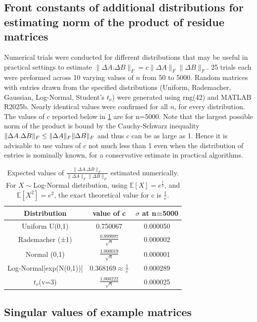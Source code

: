 \documentclass[onefignum,onetabnum]{siamart171218}
\DeclarePairedDelimiter\norm{\lVert}{\rVert}
\begin{document}
\subsection{Front constants of additional distributions for estimating norm of the product of residue matrices}
Numerical trials were conducted for different distributions that may be useful in practical settings to estimate $\|\Delta A.\Delta B\|_F = c \|\Delta A\|_F\|\Delta B\|_F$. 25 trials each were preformed across 10 varying values of $n$ from 50 to 5000. Random matrices with entries drawn from the specified distributions (Uniform, Rademacher, Gaussian, Log-Normal, Student's $t_\nu$) were generated using rng(42) and MATLAB R2025b. Nearly identical values were confirmed for all $n$, for every distribution. The values of $c$ reported below in \cref{tab:front_constants} are for n=5000. Note that the largest possible norm of the product is bound by the Cauchy-Schwarz inequality $\norm{\Delta A.\Delta B}_F \leq \norm{\Delta A}_F \norm{\Delta B}_F$ and thus $c$ can be as large as 1. Hence it is advisable to use values of $c$ not much less than 1 even when the distribution of entries is nominally known, for a conservative estimate in practical algorithms.
        \begin{table}%
        \centering
        \begin{tabular}{|c|c|c|}
        \hline
        \textbf{Distribution} & value of c & $\sigma$ at n=5000\\ \hline
        Uniform U(0,1)    &  0.750067 &  0.000050  \\ \hline
        Rademacher (±1)    & $ \frac{0.999997}{\sqrt{n}}$  & 0.000002  \\ \hline
        Normal (0,1)    & $ \frac{1.000019}{\sqrt{n}}$ & 0.000001     \\ \hline
        Log-Normal[exp(N(0,1))]    & $ 0.368169 \approx \frac{1}{e}$ & 0.000289     \\ \hline
        $t_v$(v=3)    & $ \frac{1.000222}{\sqrt{n}}$ & 0.000025    \\ \hline
        \end{tabular}
        \caption{Expected values of $\frac{\|\Delta A.\Delta B\|_F}{\|\Delta A\|_F\|\Delta B\|_F}$ estimated numerically. For $X \sim$Log-Normal distribution, using $\mathbb{E}[X]=e^{\frac{1}{2}}$, and $\mathbb{E}[X^2]=e^2$, the exact theoretical value for c is $\frac{1}{e}$.} \label{tab:front_constants}      
        \end{table}

\subsection{Singular values of example matrices} \label{sec:plots_SVD}
\end{document}

